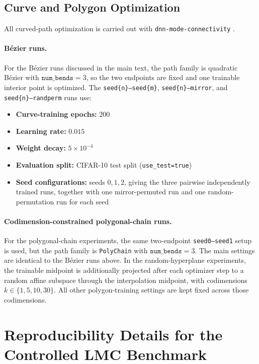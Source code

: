 \documentclass[11pt,a4paper]{report}
\begin{document}
\subsection{Curve and Polygon Optimization}

All curved-path optimization is carried out with \texttt{dnn-mode-connectivity} \citep{garipov_dnn_mode_connectivity}.

\paragraph{Bézier runs.}
For the Bézier runs discussed in the main text, the path family is quadratic Bézier with \(\texttt{num\_bends}=3\), so the two endpoints are fixed and one trainable interior point is optimized. The \texttt{seed\{n\}--seed\{m\}}, \texttt{seed\{n\}--mirror}, and \texttt{seed\{n\}--randperm} runs use:
\begin{itemize}
    \item \textbf{Curve-training epochs:} \(200\)
    \item \textbf{Learning rate:} \(0.015\)
    \item \textbf{Weight decay:} \(5\times 10^{-4}\)
    \item \textbf{Evaluation split:} CIFAR-10 test split (\texttt{use\_test=true})
    \item \textbf{Seed configurations:} seeds \(0,1,2\), giving the three pairwise independently trained runs, together with one mirror-permuted run and one random-permutation run for each seed
\end{itemize}


\paragraph{Codimension-constrained polygonal-chain runs.}
For the polygonal-chain experiments, the same two-endpoint \texttt{seed0--seed1} setup is used, but the path family is \texttt{PolyChain} with \(\texttt{num\_bends}=3\). The main settings are identical to the Bézier runs above.
In the random-hyperplane experiments, the trainable midpoint is additionally projected after each optimizer step to a random affine subspace through the interpolation midpoint, with codimensions \(k \in \{1,5,10,30\}\). All other polygon-training settings are kept fixed across those codimensions.


\section{Reproducibility Details for the Controlled LMC Benchmark}
\label{app:controlled_benchmark_repro}
\end{document}
